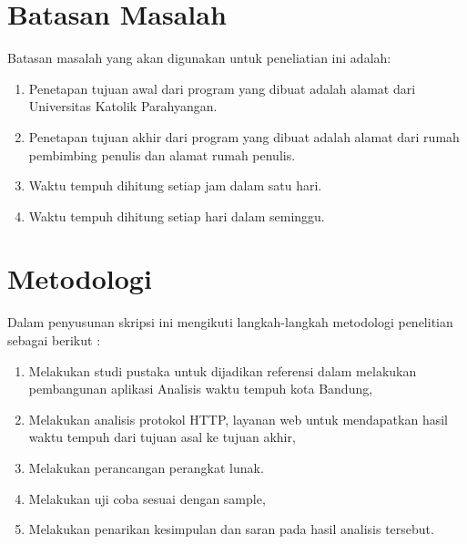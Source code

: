 \section{Batasan Masalah}
\label{sec:batasan}
Batasan masalah yang akan digunakan untuk peneliatian ini adalah:
\begin{enumerate}
	\item Penetapan tujuan awal dari program yang dibuat adalah alamat dari Universitas Katolik Parahyangan.
	\item Penetapan tujuan akhir dari program yang dibuat adalah alamat dari rumah pembimbing penulis dan alamat rumah penulis.
	\item Waktu tempuh dihitung setiap jam dalam satu hari.
	\item Waktu tempuh dihitung setiap hari dalam seminggu.
\end{enumerate}

\section{Metodologi}
\label{sec:metlit}
Dalam penyusunan skripsi ini mengikuti langkah-langkah metodologi penelitian sebagai berikut :
\begin{enumerate}
	\item Melakukan studi pustaka untuk dijadikan referensi dalam melakukan pembangunan aplikasi Analisis waktu tempuh kota Bandung,
	\item Melakukan analisis protokol HTTP, layanan web untuk mendapatkan hasil waktu tempuh dari tujuan asal ke tujuan akhir,
	\item Melakukan perancangan perangkat lunak.
	\item Melakukan uji coba sesuai dengan sample,
	\item Melakukan penarikan kesimpulan dan saran pada hasil analisis tersebut.
\end{enumerate}



